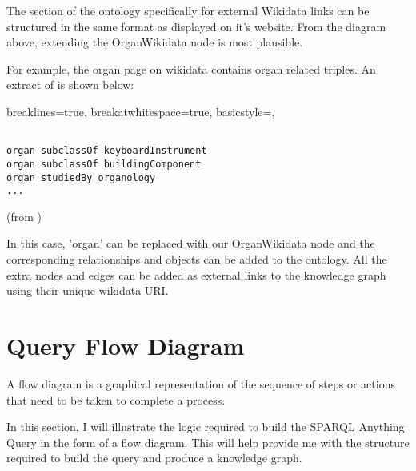 The section of the ontology specifically for external Wikidata links can be structured in the same format as displayed on it's website. From the diagram above, extending the OrganWikidata node is most plausible.

For example, the organ page on wikidata \cite{organwikidata} contains organ related triples. An extract of \cite{organwikidata} is shown below:

\lstset
{
    breaklines=true,
    breakatwhitespace=true,
    basicstyle=\ttfamily,
}
\begin{lstlisting}

organ subclassOf keyboardInstrument
organ subclassOf buildingComponent
organ studiedBy organology 
...

\end{lstlisting}
(from \cite{organwikidata})

In this case, 'organ' can be replaced with our OrganWikidata node and the corresponding relationships and objects can be added to the ontology. All the extra nodes and edges can be added as external links to the knowledge graph using their unique wikidata URI. 

\section{Query Flow Diagram}
\hspace{0.5cm} A flow diagram is a graphical representation of the sequence of steps or actions that need to be taken to complete a process. \cite{flowchart}

In this section, I will illustrate the logic required to build the SPARQL Anything Query in the form of a flow diagram. This will help provide me with the structure required to build the query and produce a knowledge graph.

\bigskip
\begin{center}
\end{center}

